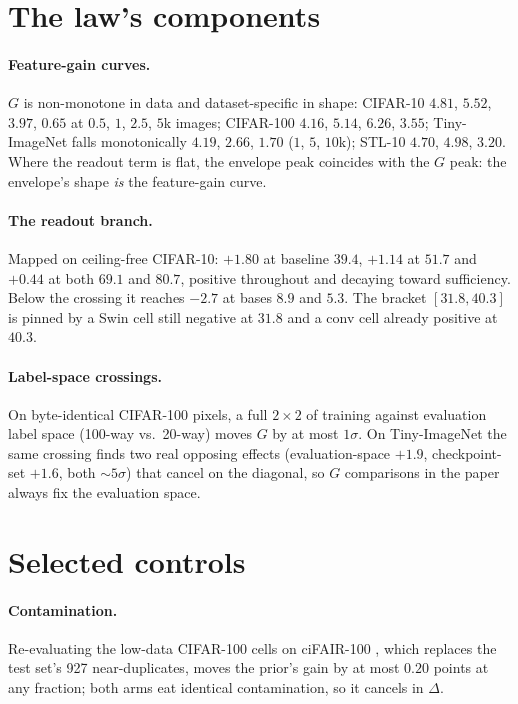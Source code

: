 \section{The law's components}\label{app:law}

\paragraph{Feature-gain curves.} $G$ is non-monotone in data and
dataset-specific in shape: CIFAR-10 $4.81$, $5.52$, $3.97$, $0.65$ at $0.5$,
$1$, $2.5$, $5$k images; CIFAR-100 $4.16$, $5.14$, $6.26$, $3.55$;
Tiny-ImageNet falls monotonically $4.19$, $2.66$, $1.70$ ($1$, $5$, $10$k);
STL-10 $4.70$, $4.98$, $3.20$. Where the readout term is flat, the envelope
peak coincides with the $G$ peak: the envelope's shape \emph{is} the
feature-gain curve.

\paragraph{The readout branch.} Mapped on ceiling-free CIFAR-10: $+1.80$ at
baseline $39.4$, $+1.14$ at $51.7$ and $+0.44$ at both $69.1$ and $80.7$,
positive throughout and decaying toward sufficiency. Below the crossing it
reaches $-2.7$ at bases $8.9$ and $5.3$. The bracket $[31.8, 40.3]$ is pinned
by a Swin cell still negative at $31.8$ and a conv cell already positive at
$40.3$.

\paragraph{Label-space crossings.} On byte-identical CIFAR-100 pixels, a full
$2{\times}2$ of training against evaluation label space (100-way vs.\ 20-way)
moves $G$ by at most $1\sigma$. On Tiny-ImageNet the same crossing finds two
real opposing effects (evaluation-space $+1.9$, checkpoint-set $+1.6$, both
${\sim}5\sigma$) that cancel on the diagonal, so $G$ comparisons in the paper
always fix the evaluation space.

\section{Selected controls}\label{app:controls}

\paragraph{Contamination.} Re-evaluating the low-data CIFAR-100 cells on
ciFAIR-100 \citep{barz2020cifair}, which replaces the test set's 927
near-duplicates, moves the prior's gain by at most $0.20$ points at any
fraction; both arms eat identical contamination, so it cancels in
$\Delta$.

